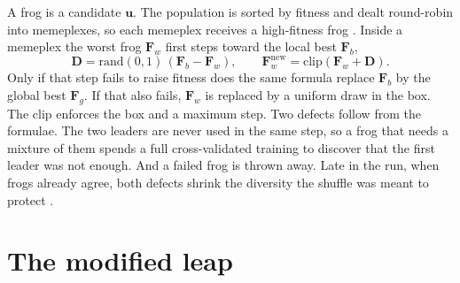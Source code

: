 \documentclass[11pt,a4paper]{article}
\newcommand{\vect}[1]{\mathbf{#1}}
\begin{document}
A frog is a candidate $\vect{u}$.
The population is sorted by fitness and dealt round-robin into memeplexes, so each memeplex receives a high-fitness frog \cite{eusuff2003,eusuff2006}.
Inside a memeplex the worst frog $\vect{F}_{w}$ first steps toward the local best $\vect{F}_{b}$,
\begin{equation}
\vect{D}=\mathrm{rand}(0,1)\,(\vect{F}_{b}-\vect{F}_{w}),
\qquad
\vect{F}_{w}^{\mathrm{new}}=\mathrm{clip}(\vect{F}_{w}+\vect{D}).
\label{eq:cascade}
\end{equation}
Only if that step fails to raise fitness does the same formula replace $\vect{F}_{b}$ by the global best $\vect{F}_{g}$.
If that also fails, $\vect{F}_{w}$ is replaced by a uniform draw in the box.
The clip enforces the box and a maximum step.
Two defects follow from the formulae.
The two leaders are never used in the same step, so a frog that needs a mixture of them spends a full cross-validated training to discover that the first leader was not enough.
And a failed frog is thrown away.
Late in the run, when frogs already agree, both defects shrink the diversity the shuffle was meant to protect \cite{you2019}.

\section{The modified leap}
\end{document}
